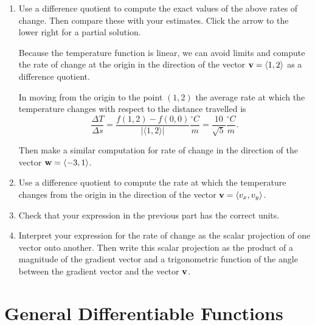 \documentclass{ximera}
\begin{document}
\begin{question}
\begin{enumerate}
\begin{enumerate}
\item ${\bf w} = \langle 2, -3\rangle$, where $\theta \sim 5.3$.

\end{enumerate}

\item Use a  difference quotient to compute the exact values of the above rates of change. Then compare these with your estimates. Click the arrow to the lower right for a partial solution.

\begin{expandable}
Because the temperature function is linear, we can avoid limits and compute the rate of change at the origin in the direction of the vector ${\bf v} = \langle 1, 2\rangle$ as a difference quotient.

In moving from the origin to the point $(1,2)$ the average rate at which the temperature changes with respect to the distance travelled is
\[
   \frac{\Delta T}{\Delta s} = \frac{f(1,2) - f(0,0)}{|\langle 1, 2 \rangle|}\frac{^\circ C}{m} = \frac{10}{\sqrt{5}}\frac{^\circ C}{m} .
\]

Then make a similar computation for rate of change in the direction of the vector ${\bf w} = \langle -3,1\rangle$.
\end{expandable}


\item Use a difference quotient to compute the rate  at which the temperature changes from the origin in the direction of the vector ${\bf v}=\langle v_x , v_y \rangle$. 

\item Check that your expression in the previous part has the correct units.

\item Interpret your expression for the rate of change as the scalar projection of one vector onto another. Then write this scalar projection as the product of a magnitude of the gradient vector and a trigonometric function of the angle between the gradient vector and the vector ${\bf v}$.

\end{enumerate}
\end{question}




\section{General Differentiable Functions}
\end{document}
